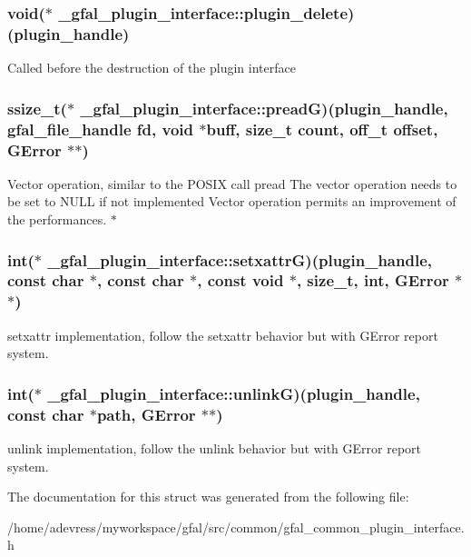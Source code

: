 \subsubsection{\setlength{\rightskip}{0pt plus 5cm}void($\ast$ \bf{\_\-gfal\_\-plugin\_\-interface::plugin\_\-delete})(plugin\_\-handle)}\label{struct__gfal__plugin__interface_d146f62bd310f1f265f0bc3c37cc70d8}


Called before the destruction of the plugin interface 
\subsubsection{\setlength{\rightskip}{0pt plus 5cm}ssize\_\-t($\ast$ \bf{\_\-gfal\_\-plugin\_\-interface::pread\-G})(plugin\_\-handle, gfal\_\-file\_\-handle fd, void $\ast$buff, size\_\-t count, off\_\-t offset, GError $\ast$$\ast$)}\label{struct__gfal__plugin__interface_efa114485546905f199568eb1648ddd3}


Vector operation, similar to the POSIX call pread The vector operation needs to be set to NULL if not implemented Vector operation permits an improvement of the performances. $\ast$ 
\subsubsection{\setlength{\rightskip}{0pt plus 5cm}int($\ast$ \bf{\_\-gfal\_\-plugin\_\-interface::setxattr\-G})(plugin\_\-handle, const char $\ast$, const char $\ast$, const void $\ast$, size\_\-t, int, GError $\ast$$\ast$)}\label{struct__gfal__plugin__interface_2ededf4f6bc7f284ac31234110ee1444}


setxattr implementation, follow the setxattr behavior but with GError report system. 
\subsubsection{\setlength{\rightskip}{0pt plus 5cm}int($\ast$ \bf{\_\-gfal\_\-plugin\_\-interface::unlink\-G})(plugin\_\-handle, const char $\ast$path, GError $\ast$$\ast$)}\label{struct__gfal__plugin__interface_75692c1e9487ff9ed7fce15dc2ddac62}


unlink implementation, follow the unlink behavior but with GError report system. 

The documentation for this struct was generated from the following file:\begin{CompactItemize}
\item 
/home/adevress/myworkspace/gfal/src/common/gfal\_\-common\_\-plugin\_\-interface.h\end{CompactItemize}
